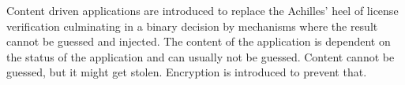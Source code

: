 Content driven applications are introduced to replace the Achilles' heel of license verification culminating in a binary decision by mechanisms where the result cannot be guessed and injected.
The content of the application is dependent on the status of the application and can usually not be guessed.
\newline
Content cannot be guessed, but it might get stolen. Encryption is introduced to prevent that.
